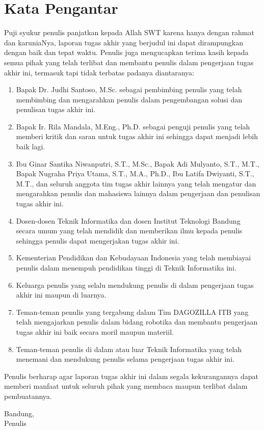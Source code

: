 \chapter*{Kata Pengantar}

Puji syukur penulis panjatkan kepada Allah SWT karena hanya dengan rahmat dan karuniaNya, laporan tugas akhir yang berjudul \thetitle{} ini dapat dirampungkan dengan baik dan tepat waktu. Penulis juga mengucapkan terima kasih kepada semua pihak yang telah terlibat dan membantu penulis dalam pengerjaan tugas akhir ini, termasuk tapi tidak terbatas padanya diantaranya:

\begin{enumerate}
    \item Bapak Dr. Judhi Santoso, M.Sc. sebagai pembimbing penulis yang telah membimbing dan mengarahkan penulis dalam pengembangan solusi dan penulisan tugas akhir ini.
    \item Bapak Ir. Rila Mandala, M.Eng., Ph.D. sebagai penguji penulis yang telah memberi kritik dan saran untuk tugas akhir ini sehingga dapat menjadi lebih baik lagi.
    \item Ibu Ginar Santika Niwanputri, S.T., M.Sc., Bapak Adi Mulyanto, S.T., M.T., Bapak Nugraha Priya Utama, S.T., M.A., Ph.D., Ibu Latifa Dwiyanti, S.T., M.T., dan seluruh anggota tim tugas akhir lainnya yang telah mengatur dan mengarahkan penulis dan mahasiswa lainnya dalam pengerjaan dan penulisan tugas akhir ini.
    \item Dosen-dosen Teknik Informatika dan dosen Institut Teknologi Bandung secara umum yang telah mendidik dan memberikan ilmu kepada penulis sehingga penulis dapat mengerjakan tugas akhir ini.
    \item Kementerian Pendidikan dan Kebudayaan Indonesia yang telah membiayai penulis dalam menempuh pendidikan tinggi di Teknik Informatika ini.
    \item Keluarga penulis yang selalu mendukung penulis di dalam pengerjaan tugas akhir ini maupun di luarnya.
    \item Teman-teman penulis yang tergabung dalam Tim DAGOZILLA ITB yang telah mengajarkan penulis dalam bidang robotika dan membantu pengerjaan tugas akhir ini baik secara moril maupun materiil.
    \item Teman-teman penulis di dalam atau luar Teknik Informatika yang telah menemani dan mendukung penulis selama pengerjaan tugas akhir ini.
\end{enumerate}

Penulis berharap agar laporan tugas akhir ini dalam segala kekurangannya dapat memberi manfaat untuk seluruh pihak yang membaca maupun terlibat dalam pembuatannya.

\begin{flushright}
    Bandung, \thedate \\[3\baselineskip]
    Penulis
\end{flushright}
